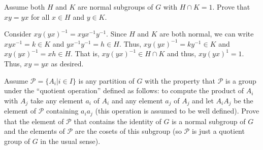 \documentclass[12 pt, letterpaper]{hmcpset}
\begin{document}
\begin{problem}
	Assume both $H$ and $K$ are normal subgroups of $G$ with $H \cap K = 1$. Prove that $xy = yx$ for all $x \in H$ and $y \in K$.
\end{problem}

\begin{solution}
	Consider $xy(yx)^{-1} = xy x^{-1} y^{-1}$. Since $H$ and $K$ are both normal, we can write $x y x^{-1} = k \in K$ and $y x^{-1} y^{-1} = h \in H$. Thus, $xy(yx)^{-1} = k y^{-1} \in K$ and $xy(yx)^{-1} = x h \in H$. That is, $xy(yx)^{-1} \in H \cap K$ and thus, $xy(yx)^{1} = 1$. Thus, $xy = yx$ as desired.
\end{solution}

\pagebreak

\begin{problem}
	Assume $\mathcal{P} = \{ A_{i} | i \in I \}$ is any partition of $G$ with the property that $\mathcal{P}$ is a group under the ``quotient operation'' defined as follows: to compute the product of $A_{i}$ with $A_{j}$ take any element $a_{i}$ of $A_{i}$ and any element $a_{j}$ of $A_{j}$ and let $A_{i}A_{j}$ be the element of $\mathcal{P}$ containing $a_{i}a_{j}$ (this operation is assumed to be well defined). Prove that the element of $\mathcal{P}$ that contains the identity of $G$ is a normal subgroup of $G$ and the elements of $\mathcal{P}$ are the cosets of this subgroup (so $\mathcal{P}$ is just a quotient group of $G$ in the usual sense).
\end{problem}
\end{document}
